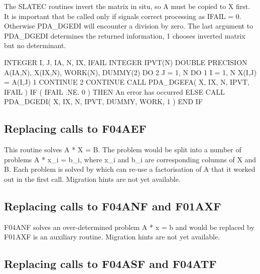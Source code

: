\documentclass[11pt,twoside,nolof]{starlink}
\begin{document}
   The SLATEC routines invert the matrix in situ, so A must be copied to
   X first. It is important that
   be called only if
   signals
   correct processing as IFAIL = 0. Otherwise PDA\_DGEDI will encounter a
   division by zero. The last argument to PDA\_DGEDI
   determines the returned information, 1 chooses inverted matrix but no
   determinant.

\begin{terminalv}
      INTEGER I, J, IA, N, IX, IFAIL
      INTEGER IPVT(N)
      DOUBLE PRECISION A(IA,N), X(IX,N), WORK(N), DUMMY(2)
      DO 2 J = 1, N
         DO 1 I = 1, N
            X(I,J) = A(I,J)
    1    CONTINUE
    2 CONTINUE
      CALL PDA_DGEFA( X, IX, N, IPVT, IFAIL )
      IF ( IFAIL .NE. 0 ) THEN
         An error has occurred
      ELSE
         CALL PDA_DGEDI( X, IX, N, IPVT, DUMMY, WORK, 1 )
      END IF
\end{terminalv}


\subsection{Replacing calls to F04AEF}

   This routine solves A * X = B. The problem would be split into a
   number of problems A * x\_i = b\_i, where x\_i and b\_i are
   corresponding columns of X and B. Each problem is solved by
   which can re-use a factorisation of A that it worked out in the first
   call.
   Migration hints are not yet available.


\subsection{Replacing calls to F04ANF and F01AXF}

   F04ANF solves an over-determined problem A * x = b and would be
   replaced by
   F01AXF is an auxiliary routine.
   Migration hints are not yet available.


\subsection{Replacing calls to F04ASF and F04ATF}
\end{document}
